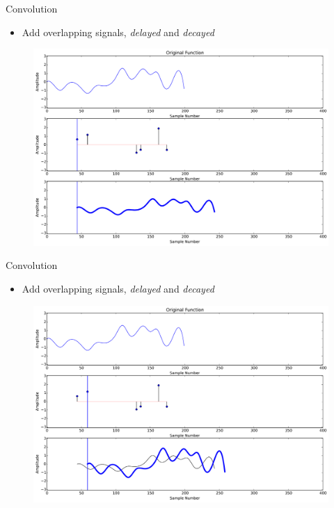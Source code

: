 \documentclass{beamer}
\begin{document}
\begin{frame}{Convolution}

\begin{itemize}[label=$\vartriangleright$]
\item Add overlapping signals, {\em delayed} and {\em decayed}
\end{itemize}

\begin{figure}[t]
	\centering
    \includegraphics[width=\textwidth]{Conv0.pdf}
\end{figure}


\end{frame}


\begin{frame}{Convolution}

\begin{itemize}[label=$\vartriangleright$]
\item Add overlapping signals, {\em delayed} and {\em decayed}
\end{itemize}

\begin{figure}[t]
	\centering
    \includegraphics[width=\textwidth]{Conv1.pdf}
\end{figure}


\end{frame}
\end{document}
